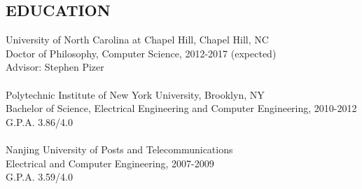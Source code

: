 \documentclass{res}
\begin{document}
\address{\bf E-MAIL \\ \texttt{cshao@cs.unc.edu}\\            \\ }
\address{\bf  CONTACT INFORMATION\\Campus Box 3175, Sitterson Hall\\ UNC-Chapel Hill\\ Chapel Hill, NC 27599-3175 USA\\(919) 619-0326}


\begin{resume}


\section{EDUCATION}
   \vspace{0.05in}
    University of North Carolina at Chapel Hill, Chapel Hill, NC\\
    Doctor of Philosophy, Computer Science, 2012-2017 (expected) \\
    Advisor: Stephen Pizer\\
    \\
    Polytechnic Institute of New York University,  Brooklyn, NY\\
    Bachelor of Science, Electrical Engineering and Computer Engineering, 2010-2012 \\
    G.P.A. 3.86/4.0 \\
    \\
    Nanjing University of Posts and Telecommunications\\
    Electrical and Computer Engineering, 2007-2009\\
    G.P.A. 3.59/4.0\\


\end{resume}
\end{document}

